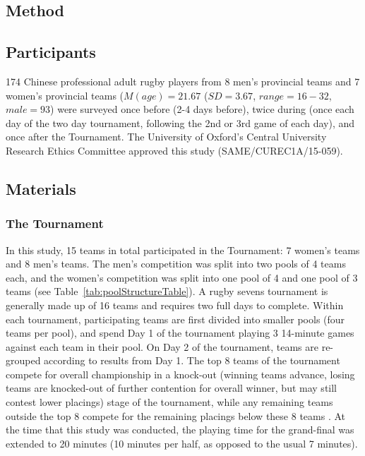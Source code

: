 \begin{CJK}{UTF8}{gbsn}
\clearpage

\section{Method}
\subsection{Participants}
174 Chinese professional adult rugby players from 8 men's provincial teams and 7 women's provincial teams ($M(age) = 21.67$ ($SD = 3.67$, $range = 16 - 32$, $male = 93$) were surveyed once before (2-4 days before), twice during (once each day of the two day tournament, following the 2nd or 3rd game of each day), and once after the Tournament.  The University of Oxford's Central University Research Ethics Committee approved this study (SAME/CUREC1A/15-059).

\subsection{Materials}

\subsubsection{The Tournament}
In this study, 15 teams in total participated in the Tournament: 7 women's teams and 8 men's teams. The men's competition was split into two pools of 4 teams each, and the women's competition was split into one pool of 4 and one pool of 3 teams (see Table~\ref{tab:poolStructureTable}).  A rugby sevens tournament is generally made up of 16 teams and requires two full days to complete.  Within each tournament, participating teams are first divided into smaller pools (four teams per pool), and spend Day 1 of the tournament playing 3 14-minute games against each team in their pool. On Day 2 of the tournament, teams are re-grouped according to results from Day 1.  The top 8 teams of the tournament compete for overall championship in a knock-out (winning teams advance, losing teams are knocked-out of further contention for overall winner, but may still contest lower placings) stage of the tournament, while any remaining teams outside the top 8 compete for the remaining placings below these 8 teams \citep[][]{WorldRugby2018}. At the time that this study was conducted, the playing time for the grand-final was extended to 20 minutes (10 minutes per half, as opposed to the usual 7 minutes).




\end{CJK}
